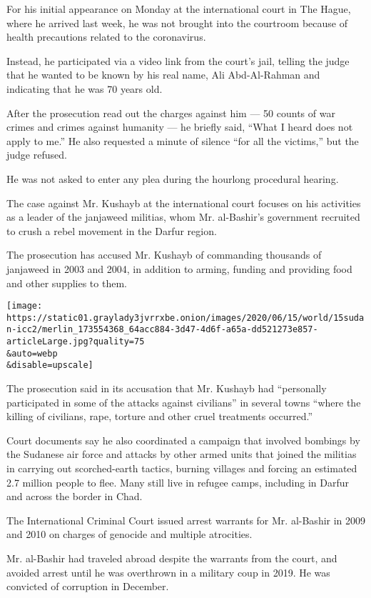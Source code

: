 For his initial appearance on Monday at the international court in The
Hague, where he arrived last week, he was not brought into the courtroom
because of health precautions related to the coronavirus.

Instead, he participated via a video link from the court's jail, telling
the judge that he wanted to be known by his real name, Ali Abd-Al-Rahman
and indicating that he was 70 years old.

After the prosecution read out the charges against him --- 50 counts of
war crimes and crimes against humanity --- he briefly said, ``What I
heard does not apply to me.'' He also requested a minute of silence
``for all the victims,'' but the judge refused.

He was not asked to enter any plea during the hourlong procedural
hearing.

The case against Mr. Kushayb at the international court focuses on his
activities as a leader of the janjaweed militias, whom Mr. al-Bashir's
government recruited to crush a rebel movement in the Darfur region.

The prosecution has accused Mr. Kushayb of commanding thousands of
janjaweed in 2003 and 2004, in addition to arming, funding and providing
food and other supplies to them.

\texttt{[image: https://static01.graylady3jvrrxbe.onion/images/2020/06/15/world/15sudan-icc2/merlin\_173554368\_64acc884-3d47-4d6f-a65a-dd521273e857-articleLarge.jpg?quality=75\\\&auto=webp\\\&disable=upscale]}

The prosecution said in its accusation that Mr. Kushayb had ``personally
participated in some of the attacks against civilians'' in several towns
``where the killing of civilians, rape, torture and other cruel
treatments occurred.''

Court documents say he also coordinated a campaign that involved
bombings by the Sudanese air force and attacks by other armed units that
joined the militias in carrying out scorched-earth tactics, burning
villages and forcing an estimated 2.7 million people to flee. Many still
live in refugee camps, including in Darfur and across the border in
Chad.

The International Criminal Court issued arrest warrants for Mr.
al-Bashir in 2009 and 2010 on charges of genocide and multiple
atrocities.

Mr. al-Bashir had traveled abroad despite the warrants from the court,
and avoided arrest until he was overthrown in a military coup in 2019.
He was convicted of corruption in December.

